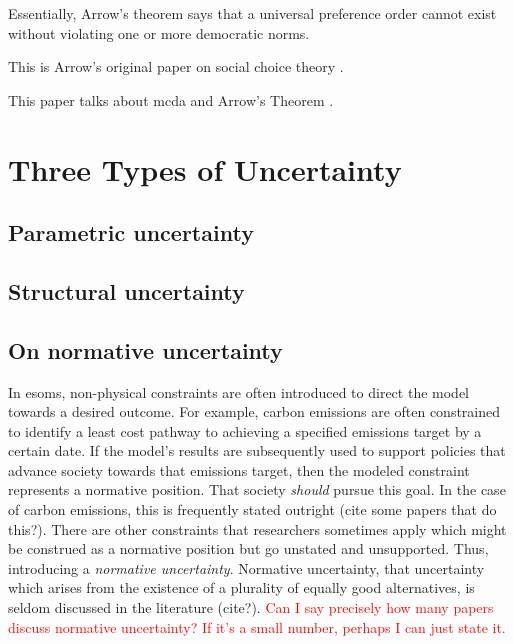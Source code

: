 Essentially, Arrow's theorem says that a universal preference order cannot exist without
violating one or more democratic norms.

This is Arrow's original paper on social choice theory \cite{arrow_difficulty_1950}.

This paper talks about \ac{mcda} and Arrow's Theorem \cite{franssen_arrows_2005}.

\section{Three Types of Uncertainty}

\subsection{Parametric uncertainty}

\subsection{Structural uncertainty}

\subsection{On normative uncertainty}
In \acp{esom}, non-physical constraints are often introduced to direct the model
towards a desired outcome. For example, carbon emissions are often constrained
to identify a least cost pathway to achieving a specified emissions target by a
certain date. If the model's results are subsequently used to support policies
that advance society towards that emissions target, then the modeled constraint
represents a normative position. That society \textit{should} pursue this goal.
In the case of carbon emissions, this is frequently stated outright (cite some
papers that do this?). There are other constraints that researchers sometimes
apply which might be construed as a normative position but go unstated and
unsupported. Thus, introducing a \textit{normative uncertainty}. Normative
uncertainty, that uncertainty which arises from the existence of a plurality of
equally good alternatives, is seldom discussed in the literature (cite?).
\textcolor{red}{Can I say precisely how many papers discuss normative
uncertainty? If it's a small number, perhaps I can just state it.}

